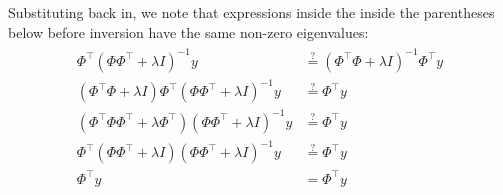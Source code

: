 \begin{Parts}
\begin{solution}
Substituting back in, we note that expressions inside the inside the parentheses below before inversion have the same non-zero eigenvalues:
\begin{align*}\begin{split}
\Phi^\top (\Phi \Phi^\top + \lambda I)^{-1}y &\stackrel{?}{=} (\Phi^\top \Phi + \lambda I)^{-1} \Phi^\top y\\
(\Phi^\top \Phi + \lambda I)\Phi^\top (\Phi \Phi^\top + \lambda I)^{-1}y &\stackrel{?}{=} \Phi^\top y\\
(\Phi^\top \Phi \Phi^\top + \lambda \Phi^\top) (\Phi \Phi^\top + \lambda I)^{-1}y &\stackrel{?}{=} \Phi^\top y\\
\Phi^\top (\Phi \Phi^\top + \lambda I) (\Phi \Phi^\top + \lambda I)^{-1}y &\stackrel{?}{=} \Phi^\top y\\
\Phi^\top y &= \Phi^\top y
\end{split}\end{align*}
\end{solution}

\end{Parts}
